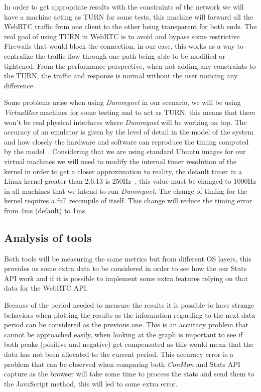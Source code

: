 In order to get appropriate results with the constraints of the network we will have a machine acting as TURN for some tests, this machine will forward all the WebRTC traffic from one client to the other being transparent for both ends. The real goal of using TURN in WebRTC is to avoid and bypass some restrictive Firewalls that would block the connection, in our case, this works as a way to centralize the traffic flow through one path being able to be modified or tightened. From the performance perspective, when not adding any constraints to the TURN, the traffic and response is normal without the user noticing any difference.

Some problems arise when using {\it Dummynet} in our scenario, we will be using {\it VirtualBox} machines for some testing and to act as TURN, this means that there won't be real physical interfaces where {\it Dummynet} will be working on top. The accuracy of an emulator is given by the level of detail in the model of the system and how closely the hardware and software can reproduce the timing computed by the model~\cite{dummynetRevisited}. Considering that we are using standard Ubuntu images for our virtual machines we will need to modify the internal timer resolution of the kernel in order to get a closer approximation to reality, the default timer in a Linux kernel greater than 2.6.13 is 250Hz~\cite{linuxKernelTime}, this value must be changed to 1000Hz in all machines that we intend to run {\it Dummynet}. The change of timing for the kernel requires a full recompile of itself. This change will reduce the timing error from 4ms (default) to 1ms.

\subsection{Analysis of tools}

Both tools will be measuring the same metrics but from different OS layers, this provides us some extra data to be considered in order to see how the our Stats API work and if it is possible to implement some extra features relying on that data for the WebRTC API.

Because of the period needed to measure the results it is possible to have strange behaviors when plotting the results as the information regarding to the next data period can be considered as the previous one. This is an accuracy problem that cannot be approached easily, when looking at the graph is important to see if both peaks (positive and negative) get compensated as this would mean that the data has not been allocated to the current period. This accuracy error is a problem that can be observed when comparing both {\it ConMon} and Stats API capture as the browser will take some time to process the stats and send them to the JavaScript method, this will led to some extra error.

